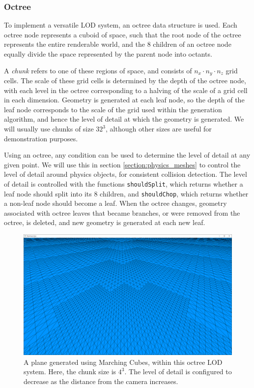 \documentclass[11pt]{article}
\begin{document}
\subsubsection{Octree}
\label{section:octree}
To implement a versatile LOD system, an octree data structure is used. Each octree node represents a cuboid of space, such that the root node of the octree represents the entire renderable world, and the 8 children of an octree node equally divide the space represented by the parent node into octants. 

A \textit{chunk} refers to one of these regions of space, and consists of $n_x \cdot n_y \cdot n_z$ grid cells. The scale of these grid cells is determined by the depth of the octree node, with each level in the octree corresponding to a halving of the scale of a grid cell in each dimension. Geometry is generated at each leaf node, so the depth of the leaf node corresponds to the scale of the grid used within the generation algorithm, and hence the level of detail at which the geometry is generated. We will usually use chunks of size $32^3$, although other sizes are useful for demonstration purposes.

Using an octree, any condition can be used to determine the level of detail at any given point. We will use this in section \ref{section:physics_meshes} to control the level of detail around physics objects, for consistent collision detection. The level of detail is controlled with the functions \texttt{shouldSplit}, which returns whether a leaf node should split into its 8 children, and \texttt{shouldChop}, which returns whether a non-leaf node should become a leaf. When the octree changes, geometry associated with octree leaves that became branches, or were removed from the octree, is deleted, and new geometry is generated at each new leaf.

\begin{figure}[H]
  \includegraphics[width=\textwidth]{octree_plane.png}
  \caption{A plane generated using Marching Cubes, within this octree LOD system. Here, the chunk size is $4^3$. The level of detail is configured to decrease as the distance from the camera increases.}
\end{figure}
\end{document}
